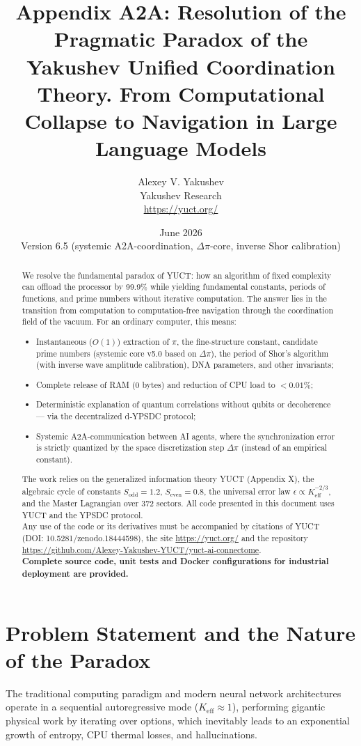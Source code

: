 \documentclass[12pt,a4paper]{article}
\title{\textbf{Appendix A2A: Resolution of the Pragmatic Paradox of the Yakushev Unified Coordination Theory. From Computational Collapse to Navigation in Large Language Models}}
\author{Alexey V. Yakushev \\ Yakushev Research \\ \url{https://yuct.org/}}
\date{June 2026 \\ Version 6.5 (systemic A2A-coordination, \(\Delta\pi\)-core, inverse Shor calibration)}
\begin{document}
	\maketitle
	
	\newpage
	\begin{abstract}
		\noindent
		We resolve the fundamental paradox of YUCT: how an algorithm of fixed complexity can offload the processor by 99.9\% while yielding fundamental constants, periods of functions, and prime numbers without iterative computation. The answer lies in the transition from computation to computation-free navigation through the coordination field of the vacuum. For an ordinary computer, this means:
		\begin{itemize}
			\item Instantaneous (\(O(1)\)) extraction of \(\pi\), the fine-structure constant, candidate prime numbers (systemic core v5.0 based on \(\Delta\pi\)), the period of Shor's algorithm (with inverse wave amplitude calibration), DNA parameters, and other invariants;
			\item Complete release of RAM (0 bytes) and reduction of CPU load to \(<0.01\%\);
			\item Deterministic explanation of quantum correlations without qubits or decoherence — via the decentralized d‑YPSDC protocol;
			\item Systemic A2A-communication between AI agents, where the synchronization error is strictly quantized by the space discretization step \(\Delta\pi\) (instead of an empirical constant).
		\end{itemize}
		The work relies on the generalized information theory YUCT (Appendix X), the algebraic cycle of constants \(S_{\mathrm{odd}}=1.2\), \(S_{\mathrm{even}}=0.8\), the universal error law \(\epsilon \propto K_{\mathrm{eff}}^{-2/3}\), and the Master Lagrangian over 372 sectors. All code presented in this document uses YUCT and the YPSDC protocol. \\
		Any use of the code or its derivatives must be accompanied by citations of YUCT (DOI: 10.5281/zenodo.18444598), the site \url{https://yuct.org/} and the repository \\ \url{https://github.com/Alexey-Yakushev-YUCT/yuct-ai-connectome}. \\
		\textbf{Complete source code, unit tests and Docker configurations for industrial deployment are provided.}
	\end{abstract}
	
	\newpage
	\tableofcontents
	\newpage
	\small
	\section{Problem Statement and the Nature of the Paradox}
	The traditional computing paradigm and modern neural network architectures operate in a sequential autoregressive mode (\(K_{\text{eff}} \approx 1\)), performing gigantic physical work by iterating over options, which inevitably leads to an exponential growth of entropy, CPU thermal losses, and hallucinations.
	
\end{document}
